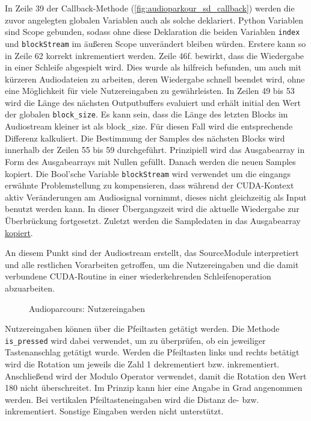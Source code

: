In Zeile 39 der Callback-Methode (\ref{fig:audioparkour_sd_callback})   werden die zuvor angelegten globalen Variablen auch als solche deklariert. Python Variablen sind Scope gebunden, sodass ohne diese Deklaration die beiden Variablen \texttt{index} und \texttt{blockStream} im äußeren Scope unverändert bleiben würden. Erstere kann so in Zeile 62 korrekt inkrementiert werden. Zeile 46f. bewirkt, dass die Wiedergabe in einer Schleife abgespielt wird. Dies wurde als hilfreich befunden, um auch mit kürzeren Audiodateien zu arbeiten, deren Wiedergabe schnell beendet wird, ohne eine Möglichkeit für viele Nutzereingaben zu gewährleisten. 
In Zeilen 49 bis 53 wird die Länge des nächsten Outputbuffers evaluiert und erhält initial den Wert der globalen \texttt{block\_size}. Es kann sein, dass die Länge des letzten Blocks im Audiostream kleiner ist als block\_size. Für diesen Fall wird die entsprechende Differenz kalkuliert. 
Die Bestimmung der Samples des nächsten Blocks wird innerhalb der Zeilen 55 bis 59 durchgeführt. Prinzipiell wird das Ausgabearray in Form des Ausgabearrays mit Nullen gefüllt. Danach werden die neuen Samples kopiert. Die Bool'sche Variable \texttt{blockStream} wird verwendet um die eingangs erwähnte Problemstellung zu kompensieren, dass während der CUDA-Kontext aktiv Veränderungen am Audiosignal vornimmt, dieses nicht gleichzeitig als Input benutzt werden kann. In dieser Übergangszeit wird die aktuelle Wiedergabe zur Überbrückung fortgesetzt. Zuletzt werden die Sampledaten in das Ausgabearray \underline{kopiert}. 


An diesem Punkt sind der Audiostream erstellt, das SourceModule interpretiert und alle restlichen Vorarbeiten getroffen, um die Nutzereingaben und die damit verbundene CUDA-Routine in einer wiederkehrenden Schleifenoperation abzuarbeiten. 

\begin{figure}[h!]
	
	\caption{Audioparcours: Nutzereingaben}
	\label{fig:audioparkour_userInput}
\end{figure}

Nutzereingaben können über die Pfeiltasten getätigt werden. Die Methode \texttt{is\_pressed} wird dabei verwendet, um zu überprüfen, ob ein jeweiliger Tastenanschlag getätigt wurde. Werden die Pfeiltasten links und rechts betätigt wird die Rotation um jeweils die Zahl 1 dekrementiert bzw. inkrementiert. Anschließend wird der Modulo Operator verwendet, damit die Rotation den Wert 180 nicht überschreitet. Im Prinzip kann hier eine Angabe in Grad angenommen werden.
Bei vertikalen Pfeiltasteneingaben wird die Distanz de- bzw. inkrementiert. 
Sonstige Eingaben werden nicht unterstützt.

